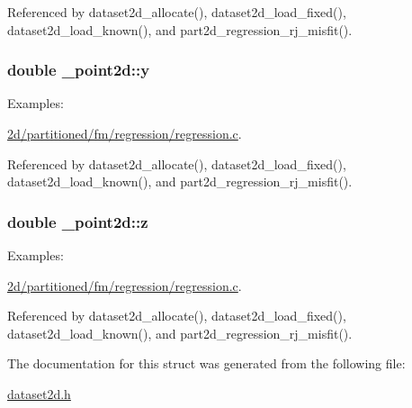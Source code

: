 Referenced by dataset2d\+\_\+allocate(), dataset2d\+\_\+load\+\_\+fixed(), dataset2d\+\_\+load\+\_\+known(), and part2d\+\_\+regression\+\_\+rj\+\_\+misfit().

\subsubsection[{\texorpdfstring{y}{y}}]{\setlength{\rightskip}{0pt plus 5cm}double \+\_\+point2d\+::y}\hypertarget{struct__point2d_a55d546cf232f5875cc0d27ba80b148e3}{}\label{struct__point2d_a55d546cf232f5875cc0d27ba80b148e3}
\begin{Desc}
\item[Examples\+: ]\par
\hyperlink{2d_2partitioned_2fm_2regression_2regression_8c-example}{2d/partitioned/fm/regression/regression.\+c}.\end{Desc}


Referenced by dataset2d\+\_\+allocate(), dataset2d\+\_\+load\+\_\+fixed(), dataset2d\+\_\+load\+\_\+known(), and part2d\+\_\+regression\+\_\+rj\+\_\+misfit().

\subsubsection[{\texorpdfstring{z}{z}}]{\setlength{\rightskip}{0pt plus 5cm}double \+\_\+point2d\+::z}\hypertarget{struct__point2d_aaa3dfda21bc9f5d84955e5e38dd72135}{}\label{struct__point2d_aaa3dfda21bc9f5d84955e5e38dd72135}
\begin{Desc}
\item[Examples\+: ]\par
\hyperlink{2d_2partitioned_2fm_2regression_2regression_8c-example}{2d/partitioned/fm/regression/regression.\+c}.\end{Desc}


Referenced by dataset2d\+\_\+allocate(), dataset2d\+\_\+load\+\_\+fixed(), dataset2d\+\_\+load\+\_\+known(), and part2d\+\_\+regression\+\_\+rj\+\_\+misfit().



The documentation for this struct was generated from the following file\+:\begin{DoxyCompactItemize}
\item 
\hyperlink{dataset2d_8h}{dataset2d.\+h}\end{DoxyCompactItemize}
